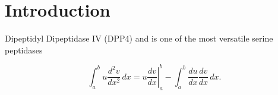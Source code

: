 \section{Introduction}
\label{intro} 

Dipeptidyl Dipeptidase IV (DPP4) and is one of the most versatile serine peptidases  

\begin{equation}
\label{eqn:drag}
	\int_a^bu\frac{d^2v}{dx^2}\,dx
	=\left.u\frac{dv}{dx}\right|_a^b
	-\int_a^b\frac{du}{dx}\frac{dv}{dx}\,dx.
\end{equation}
